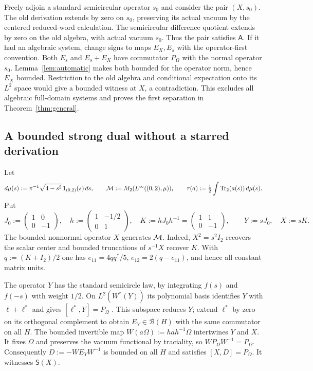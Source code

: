 Freely adjoin a standard semicircular operator $s_0$ and consider the pair $(X,s_0)$.
The old derivation extends by zero on $s_0$, preserving its actual vacuum by the centered reduced-word calculation.
The semicircular difference quotient extends by zero on the old algebra, with actual vacuum $s_0$.
Thus the pair satisfies $\mathsf A$.
If it had an algebraic system, change signs to maps $E_X,E_s$ with the operator-first convention.
Both $E_s$ and $E_s+E_X$ have commutator $P_\Omega$ with the normal operator $s_0$.
Lemma~\ref{lem:automatic} makes both bounded for the operator norm, hence $E_X$ bounded.
Restriction to the old algebra and conditional expectation onto its $L^2$ space would give a bounded witness at $X$, a contradiction.
This excludes all algebraic full-domain systems and proves the first separation in Theorem~\ref{thm:general}.

\subsection{A bounded strong dual without a starred derivation}
Let
\[
 d\mu(s):=\pi^{-1}\sqrt{4-s^2}\,1_{(0,2)}(s)\,ds,
 \qquad\mathcal M:=M_2(L^\infty((0,2),\mu)),
 \qquad\tau(a):=\tfrac12\int\operatorname{Tr}_2(a(s))\,d\mu(s).
\]
Put
\[
 J_0:=\begin{pmatrix}1&0\\0&-1\end{pmatrix},\quad
 h:=\begin{pmatrix}1&-1/2\\0&1\end{pmatrix},\quad
 K:=hJ_0h^{-1}=\begin{pmatrix}1&1\\0&-1\end{pmatrix},
 \qquad Y:=sJ_0,\quad X:=sK.
\]
The bounded nonnormal operator $X$ generates $\mathcal M$.
Indeed, $X^2=s^2I_2$ recovers the scalar center and bounded truncations of $s^{-1}X$ recover $K$.
With $q:=(K+I_2)/2$ one has $e_{11}=4qq^*/5$, $e_{12}=2(q-e_{11})$, and hence all constant matrix units.

The operator $Y$ has the standard semicircle law, by integrating $f(s)$ and $f(-s)$ with weight $1/2$.
On $L^2(W^*(Y))$ its polynomial basis identifies $Y$ with $\ell+\ell^*$ and gives $[\ell^*,Y]=P_\Omega$ \cite{Miy22}.
This subspace reduces $Y$; extend $\ell^*$ by zero on its orthogonal complement to obtain $E_Y\in\mathcal B(H)$ with the same commutator on all $H$.
The bounded invertible map $W(a\Omega):=hah^{-1}\Omega$ intertwines $Y$ and $X$.
It fixes $\Omega$ and preserves the vacuum functional by traciality, so $WP_\Omega W^{-1}=P_\Omega$.
Consequently $D:=-WE_YW^{-1}$ is bounded on all $H$ and satisfies $[X,D]=P_\Omega$.
It witnesses $\mathsf S(X)$.

